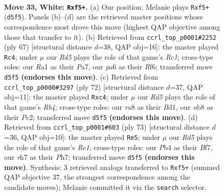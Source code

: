 \documentclass[11pt]{article}
\begin{document}
\clearpage

\begin{figure}[p]\centering
\begin{subfigure}{0.46\textwidth}\centering
\resizebox{\linewidth}{!}{%
\newchessgame
\chessboard[
  setfen={rn3k2/7r/p7/3R1p2/1P3P2/2B3K1/P3b3/R7 w - - 7 33},
  showmover=false,
  pgfstyle=straightmove, color=movearrow, markmove={d5-f5}
]}
\caption{}
\end{subfigure}\hfill
\begin{subfigure}{0.46\textwidth}\centering
\resizebox{\linewidth}{!}{%
\newchessgame
\chessboard[
  setfen={2r3k1/p4p2/5r2/8/1P5b/2NRP3/PR6/6K1 b - - 2 34},
  showmover=false,
  pgfstyle=straightmove, color=movearrow, markmove={c8-c4}
]}
\caption{}
\end{subfigure}
\\[4pt]
\begin{subfigure}{0.46\textwidth}\centering
\resizebox{\linewidth}{!}{%
\newchessgame
\chessboard[
  setfen={6k1/5p2/p7/r4p2/PRp5/6b1/2P3P1/3B1K2 w - - 1 37},
  showmover=false,
  pgfstyle=straightmove, color=movearrow, markmove={b4-c4}
]}
\caption{}
\end{subfigure}\hfill
\begin{subfigure}{0.46\textwidth}\centering
\resizebox{\linewidth}{!}{%
\newchessgame
\chessboard[
  setfen={4r2k/1r3b1p/6p1/8/3RP2P/R7/6B1/7K b - - 0 37},
  showmover=false,
  pgfstyle=straightmove, color=movearrow, markmove={e8-e5}
]}
\caption{}
\end{subfigure}
\caption{\textbf{Move 33, White: \texttt{Rxf5+}.} (a) Our position; Melanie plays \texttt{Rxf5+} (\texttt{d5f5}). Panels (b)--(d) are the retrieved master positions whose correspondence most drove this move (highest QAP objective among those that transfer to it). (b) Retrieved from \texttt{ccrl\_top\_p0001\#2252} (ply 67) [structural distance $d$=38, QAP obj=16]: the master played \texttt{Rc4}; under $\mu$ our \emph{Rd5} plays the role of that game's \emph{Rc1}; cross-type roles: our \emph{R}a1 as their \emph{P}a7, our \emph{p}a6 as their \emph{R}f6; transferred move \texttt{d5f5} \textbf{(endorses this move)}. (c) Retrieved from \texttt{ccrl\_top\_p0000\#3297} (ply 72) [structural distance $d$=37, QAP obj=11]: the master played \texttt{Rxc4}; under $\mu$ our \emph{Rd5} plays the role of that game's \emph{Rb4}; cross-type roles: our \emph{r}a8 as their \emph{B}d1, our \emph{n}b8 as their \emph{P}c2; transferred move \texttt{d5f5} \textbf{(endorses this move)}. (d) Retrieved from \texttt{ccrl\_top\_p0001\#603} (ply 73) [structural distance $d$=36, QAP obj=10]: the master played \texttt{Re5}; under $\mu$ our \emph{Rd5} plays the role of that game's \emph{Re1}; cross-type roles: our \emph{P}b4 as their \emph{B}f7, our \emph{r}h7 as their \emph{P}h7; transferred move \texttt{d5f5} \textbf{(endorses this move)}. Synthesis: 3 retrieved analogs transferred to \texttt{Rxf5+} (summed QAP objective 37, the strongest correspondence among the candidate moves); Melanie committed it via the \texttt{search} selector.}
\label{fig:thought-m64}
\end{figure}
\end{document}
